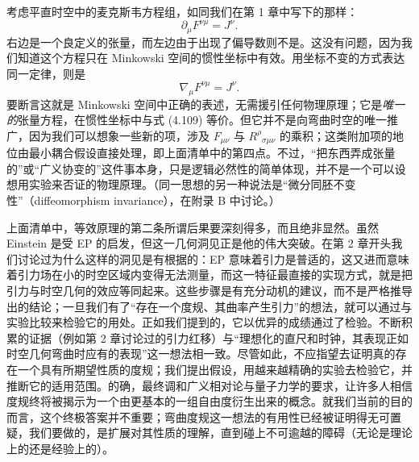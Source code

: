考虑平直时空中的麦克斯韦方程组，如同我们在第 1 章中写下的那样：
\begin{equation*}
\partial_\mu F^{\nu\mu} = J^\nu.
\tag{4.109}
\end{equation*}
右边是一个良定义的张量，而左边由于出现了偏导数则不是。这没有问题，因为我们知道这个方程只在 Minkowski 空间的惯性坐标中有效。用坐标不变的方式表达同一定律，则是
\begin{equation*}
\nabla_\mu F^{\nu\mu} = J^\nu.
\tag{4.110}
\end{equation*}
要断言这就是 Minkowski 空间中正确的表述，无需援引任何物理原理；它是\emph{唯一的}张量方程，在惯性坐标中与式 (4.109) 等价。但它并不是向弯曲时空的唯一推广，因为我们可以想象一些新的项，涉及 $F_{\mu\nu}$ 与 $R^\rho{}_{\sigma\mu\nu}$ 的乘积；这类附加项的地位由最小耦合假设直接处理，即上面清单中的第四点。不过，“把东西弄成张量的”或“广义协变的”这件事本身，只是逻辑必然性的简单体现，并不是一个可以设想用实验来否证的物理原理。（同一思想的另一种说法是“微分同胚不变性”（diffeomorphism invariance），在附录 B 中讨论。）

上面清单中，等效原理的第二条所谓后果要深刻得多，而且绝非显然。虽然 Einstein 是受 EP 的启发，但这一几何洞见正是他的伟大突破。在第 2 章开头我们讨论过为什么这样的洞见是有根据的：EP 意味着引力是普适的，这又进而意味着引力场在小的时空区域内变得无法测量，而这一特征最直接的实现方式，就是把引力与时空几何的效应等同起来。这些步骤是有充分动机的建议，而不是严格推导出的结论；一旦我们有了“存在一个度规、其曲率产生引力”的想法，就可以通过与实验比较来检验它的用处。正如我们提到的，它以优异的成绩通过了检验。不断积累的证据（例如第 2 章讨论过的引力红移）与“理想化的直尺和时钟，其表现正如时空几何弯曲时应有的表现”这一想法相一致。尽管如此，不应指望去证明真的存在一个具有所期望性质的度规；我们提出假设，用越来越精确的实验去检验它，并推断它的适用范围。的确，最终调和广义相对论与量子力学的要求，让许多人相信度规终将被揭示为一个由更基本的一组自由度衍生出来的概念。就我们当前的目的而言，这个终极答案并不重要；弯曲度规这一想法的有用性已经被证明得无可置疑，我们要做的，是扩展对其性质的理解，直到碰上不可逾越的障碍（无论是理论上的还是经验上的）。

